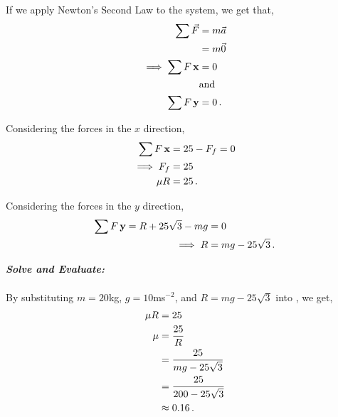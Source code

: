 \begin{subquestions}
If we apply Newton's Second Law to the system, we get that,
\begin{align}
	\sum \vec{F} & = m\vec{a} \nonumber \\
	& = m\vec{0} \nonumber \\
	\implies \sum F\,\mathbf{x} & = 0  \\
	& \text {and} \nonumber \\
	\sum F\,\mathbf{y} & = 0 \,.
\end{align}
	
Considering the forces in the $x$ direction,
\begin{align}
	\sum F\,\mathbf{x} & = 25 - F_f =0 \nonumber \\
	\implies F_f & = 25 \nonumber \\
	         \mu R & = 25 \,. \label{2016:q6:EqnB}
\end{align}

Considering the forces in the $y$ direction,
\begin{align}
	\sum F\,\mathbf{y} = R + 25\sqrt{3} -mg & = 0 \nonumber \\
	         \implies R & = mg - 25\sqrt{3} \,.
\end{align}




\textbf{\textit{Solve and Evaluate:}} \\ \\
By substituting $m=20$kg, $g=10$ms$^{-2}$, and $R = mg - 25\sqrt{3}$ into , we get,
\begin{align}
	\mu R & = 25 \nonumber \\
	\mu & = \frac{25}{R} \nonumber \\
	& = \frac{25}{mg - 25\sqrt{3}} \nonumber \\
	& = \frac{25}{200 - 25\sqrt{3}} \nonumber \\
	& \approx 0.16 \,.
\end{align}

\end{subquestions}



